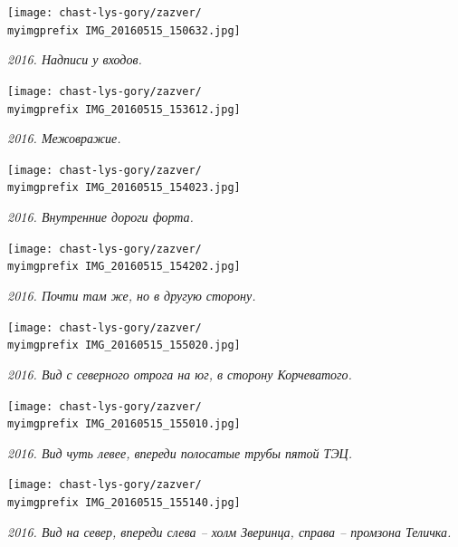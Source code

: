 \begin{center}
\texttt{[image: chast-lys-gory/zazver/\\myimgprefix IMG\_20160515\_150632.jpg]}

\textit{2016. Надписи у входов.}
\end{center}
\vspace*{\fill}
\newpage

\begin{center}
\texttt{[image: chast-lys-gory/zazver/\\myimgprefix IMG\_20160515\_153612.jpg]}

\textit{2016. Межовражие.}
\end{center}

\begin{center}
\texttt{[image: chast-lys-gory/zazver/\\myimgprefix IMG\_20160515\_154023.jpg]}

\textit{2016. Внутренние дороги форта.}
\end{center}

\newpage
\vspace*{\fill}
\begin{center}
\texttt{[image: chast-lys-gory/zazver/\\myimgprefix IMG\_20160515\_154202.jpg]}

\textit{2016. Почти там же, но в другую сторону.}
\end{center}
\vspace*{\fill}
\newpage


\begin{center}
\texttt{[image: chast-lys-gory/zazver/\\myimgprefix IMG\_20160515\_155020.jpg]}

\textit{2016. Вид с северного отрога на юг, в сторону Корчеватого.}
\end{center}


\begin{center}
\texttt{[image: chast-lys-gory/zazver/\\myimgprefix IMG\_20160515\_155010.jpg]}

\textit{2016. Вид чуть левее, впереди полосатые трубы пятой ТЭЦ.}
\end{center}


\newpage
\vspace*{\fill}

\begin{center}
\texttt{[image: chast-lys-gory/zazver/\\myimgprefix IMG\_20160515\_155140.jpg]}

\textit{2016. Вид на север, впереди слева – холм Зверинца, справа – промзона Теличка.}
\end{center}
\vspace*{\fill}

